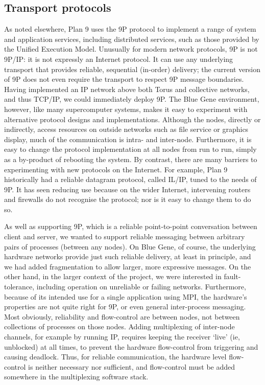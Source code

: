 \subsection{Transport protocols}

As noted elsewhere, Plan 9 uses the 9P protocol to implement a range
of system and application services, including distributed services,
such as those provided by the Unified Execution Model.  Unusually for
modern network protocols, 9P is not 9P/IP: it is not expressly an
Internet protocol.  It can use any underlying transport that provides
reliable, sequential (in-order) delivery; the current version of 9P
does not even require the transport to respect 9P message boundaries.
Having implemented an IP network above both Torus and collective
networks, and thus TCP/IP, we could immediately deploy 9P.  The Blue
Gene environment, however, like many supercomputer systems, makes it
easy to experiment with alternative protocol designs and
implementations.  Although the nodes, directly or indirectly, access
resources on outside networks such as file service or graphics
display, much of the communication is intra- and inter-node.
Furthermore, it is easy to change the protocol implementation at all
nodes from run to run, simply as a by-product of rebooting the system.
By contrast, there are many barriers to experimenting with new
protocols on the Internet.  For example, Plan 9 historically had a
reliable datagram protocol, called IL/IP, tuned to the needs of 9P.
It has seen reducing use because on the wider Internet, intervening
routers and firewalls do not recognise the protocol; nor is it easy to
change them to do so.

As well as supporting 9P, which is a reliable point-to-point
conversation between client and server, we wanted to support reliable
messaging between arbitrary pairs of processes (between any nodes).
On Blue Gene, of course, the underlying hardware networks provide just
such reliable delivery, at least in principle, and we had added
fragmentation to allow larger, more expressive messages.  On the other
hand, in the larger context of the project, we were interested in
fault-tolerance, including operation on unreliable or failing
networks.  Furthermore, because of its intended use for a single
application using MPI, the hardware's properties are not quite right
for 9P, or even general inter-process messaging.  Most obviously,
reliability and flow-control are between nodes, not between
collections of processes on those nodes.  Adding multiplexing of
inter-node channels, for example by running IP, requires keeping the
receiver `live' (ie, unblocked) at all times, to prevent the hardware
flow-control from triggering and causing deadlock. Thus, for reliable
communication, the hardware level flow-control is neither necessary
nor sufficient, and flow-control must be added somewhere in the
multiplexing software stack.

